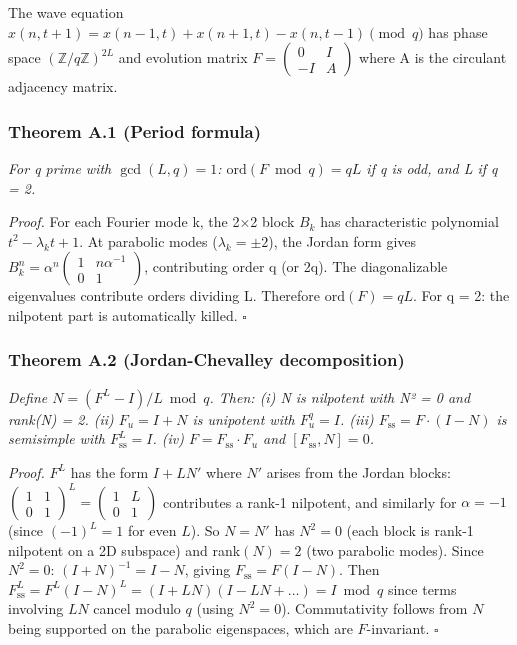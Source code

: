 \documentclass[
]{article}
\begin{document}
The wave equation
\(x(n, t+1) = x(n-1, t) + x(n+1, t) - x(n, t-1) \pmod{q}\) has phase
space \((\mathbb{Z}/q\mathbb{Z})^{2L}\) and evolution matrix
\(F = \left(\begin{smallmatrix} 0 & I \\ -I & A \end{smallmatrix}\right)\)
where A is the circulant adjacency matrix.

\hypertarget{theorem-a.1-period-formula}{%
\subsubsection{Theorem A.1 (Period
formula)}\label{theorem-a.1-period-formula}}

\emph{For q prime with \(\gcd(L, q) = 1\):
\(\mathrm{ord}(F \bmod q) = qL\) if q is odd, and L if q = 2.}

\emph{Proof.} For each Fourier mode k, the 2×2 block \(B_k\) has
characteristic polynomial \(t^2 - \lambda_k t + 1\). At parabolic modes
(\(\lambda_k = \pm 2\)), the Jordan form gives
\(B_k^n = \alpha^n \left(\begin{smallmatrix} 1 & n\alpha^{-1} \\ 0 & 1 \end{smallmatrix}\right)\),
contributing order q (or 2q). The diagonalizable eigenvalues contribute
orders dividing L. Therefore \(\mathrm{ord}(F) = qL\). For q = 2: the
nilpotent part is automatically killed. \(\square\)

\hypertarget{theorem-a.2-jordan-chevalley-decomposition}{%
\subsubsection{Theorem A.2 (Jordan-Chevalley
decomposition)}\label{theorem-a.2-jordan-chevalley-decomposition}}

\emph{Define \(N = (F^L - I)/L \bmod q\). Then: (i) N is nilpotent with
N² = 0 and rank(N) = 2. (ii) \(F_u = I + N\) is unipotent with
\(F_u^q = I\). (iii) \(F_{\mathrm{ss}} = F \cdot (I - N)\) is semisimple
with \(F_{\mathrm{ss}}^L = I\). (iv) \(F = F_{\mathrm{ss}} \cdot F_u\)
and \([F_{\mathrm{ss}}, N] = 0\).}

\emph{Proof.} \(F^L\) has the form \(I + LN'\) where \(N'\) arises from
the Jordan blocks:
\(\left(\begin{smallmatrix} 1 & 1 \\ 0 & 1 \end{smallmatrix}\right)^L = \left(\begin{smallmatrix} 1 & L \\ 0 & 1 \end{smallmatrix}\right)\)
contributes a rank-1 nilpotent, and similarly for \(\alpha = -1\) (since
\((-1)^L = 1\) for even \(L\)). So \(N = N'\) has \(N^2 = 0\) (each
block is rank-1 nilpotent on a 2D subspace) and rank\((N) = 2\) (two
parabolic modes). Since \(N^2 = 0\): \((I + N)^{-1} = I - N\), giving
\(F_{\mathrm{ss}} = F(I - N)\). Then
\(F_{\mathrm{ss}}^L = F^L(I - N)^L = (I + LN)(I - LN + \ldots) = I \bmod q\)
since terms involving \(LN\) cancel modulo \(q\) (using \(N^2 = 0\)).
Commutativity follows from \(N\) being supported on the parabolic
eigenspaces, which are \(F\)-invariant. \(\square\)
\end{document}
